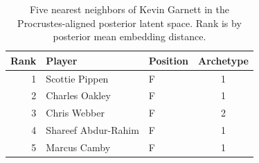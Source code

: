 \begin{table}[htbp]
  \centering\small
  \begin{tabular}{rllc}
    \toprule
    Rank & Player & Position & Archetype \\
    \midrule
    1 & Scottie Pippen & F & 1 \\
    2 & Charles Oakley & F & 1 \\
    3 & Chris Webber & F & 2 \\
    4 & Shareef Abdur-Rahim & F & 1 \\
    5 & Marcus Camby & F & 1 \\
    \bottomrule
  \end{tabular}
  \caption{Five nearest neighbors of Kevin Garnett in the Procrustes-aligned posterior latent space. Rank is by posterior mean embedding distance.}
  \label{tab:Kevin_Garnett_neighbors}
\end{table}

